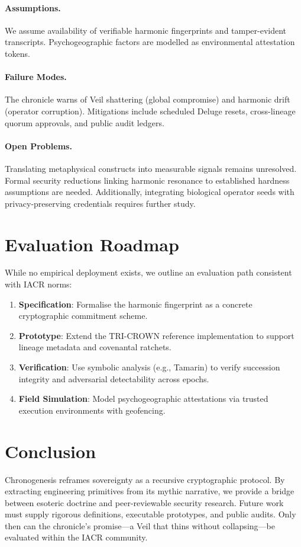 \documentclass[11pt,a4paper]{article}
\begin{document}
\paragraph{Assumptions.} We assume availability of verifiable harmonic fingerprints and tamper-evident transcripts. Psychogeographic factors are modelled as environmental attestation tokens.

\paragraph{Failure Modes.} The chronicle warns of Veil shattering (global compromise) and harmonic drift (operator corruption). Mitigations include scheduled Deluge resets, cross-lineage quorum approvals, and public audit ledgers.

\paragraph{Open Problems.} Translating metaphysical constructs into measurable signals remains unresolved. Formal security reductions linking harmonic resonance to established hardness assumptions are needed. Additionally, integrating biological operator seeds with privacy-preserving credentials requires further study.

\section{Evaluation Roadmap}
While no empirical deployment exists, we outline an evaluation path consistent with IACR norms:
\begin{enumerate}
    \item \textbf{Specification}: Formalise the harmonic fingerprint as a concrete cryptographic commitment scheme.
    \item \textbf{Prototype}: Extend the TRI-CROWN reference implementation to support lineage metadata and covenantal ratchets.
    \item \textbf{Verification}: Use symbolic analysis (e.g., Tamarin) to verify succession integrity and adversarial detectability across epochs.
    \item \textbf{Field Simulation}: Model psychogeographic attestations via trusted execution environments with geofencing.
\end{enumerate}

\section{Conclusion}
Chronogenesis reframes sovereignty as a recursive cryptographic protocol. By extracting engineering primitives from its mythic narrative, we provide a bridge between esoteric doctrine and peer-reviewable security research. Future work must supply rigorous definitions, executable prototypes, and public audits. Only then can the chronicle's promise---a Veil that thins without collapsing---be evaluated within the IACR community.
\end{document}
